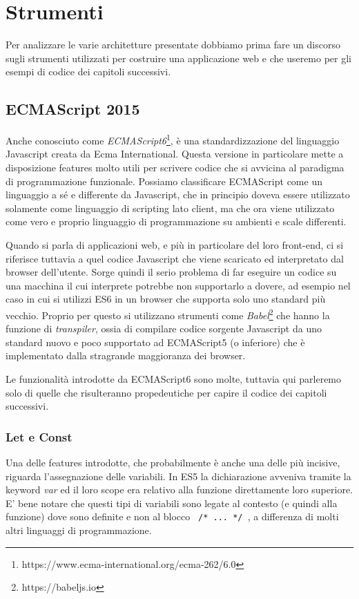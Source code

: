 \chapter{Strumenti}
Per analizzare le varie architetture presentate dobbiamo prima fare un discorso sugli strumenti utilizzati per costruire una applicazione web e che useremo per gli esempi di codice dei capitoli successivi.

\section{ECMAScript 2015}
Anche conosciuto come \textit{ECMAScript6}\footnote{https://www.ecma-international.org/ecma-262/6.0}, è una standardizzazione del linguaggio Javascript creata da Ecma International. Questa versione in particolare mette a disposizione features molto utili per scrivere codice che si avvicina al paradigma di programmazione funzionale. Possiamo classificare ECMAScript come un linguaggio a sé e differente da Javascript, che in principio doveva essere utilizzato solamente come linguaggio di scripting lato client, ma che ora viene utilizzato come vero e proprio linguaggio di programmazione su ambienti e scale differenti.
 
Quando si parla di applicazioni web, e più in particolare del loro front-end, ci si riferisce tuttavia a quel codice Javascript che viene scaricato ed interpretato dal browser dell'utente. Sorge quindi il serio problema di far eseguire un codice su una macchina il cui interprete potrebbe non supportarlo a dovere, ad esempio nel caso in cui si utilizzi ES6 in un browser che supporta solo uno standard più vecchio. Proprio per questo si utilizzano strumenti come \textit{Babel}\footnote{https://babeljs.io} che hanno la funzione di \textit{transpiler}, ossia di compilare codice sorgente Javascript da uno standard nuovo e poco supportato ad ECMAScript5 (o inferiore) che è implementato dalla stragrande maggioranza dei browser.

Le funzionalità introdotte da ECMAScript6 sono molte, tuttavia qui parleremo solo di quelle che risulteranno propedeutiche per capire il codice dei capitoli successivi.

\subsection{Let e Const}
Una delle features introdotte, che probabilmente è anche una delle più incisive, riguarda l'assegnazione delle variabili. In ES5 la dichiarazione avveniva tramite la keyword \textit{var} ed il loro scope era relativo alla funzione direttamente loro superiore. E' bene notare che questi tipi di variabili sono legate al contesto (e quindi alla funzione) dove sono definite e non al blocco \texttt{{ /* ... */ }}, a differenza di molti altri linguaggi di programmazione.
 
